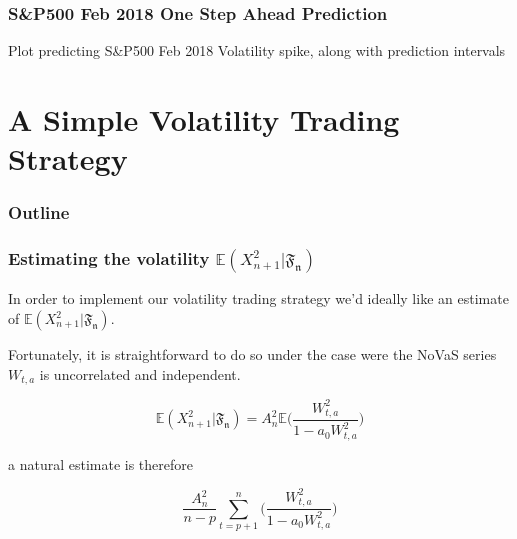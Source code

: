 \documentclass{beamer}
\begin{document}
\begin{frame}
\frametitle{S\&P500 Feb 2018 One Step Ahead Prediction}
Plot predicting S\&P500 Feb 2018 Volatility spike, along with prediction intervals

\end{frame}

\section{A Simple Volatility Trading Strategy}

\begin{frame}
\frametitle{Outline}
\tableofcontents[currentsection]
\end{frame}

\begin{frame}
\frametitle{Estimating the volatility $\mathbb{E}(X_{n+1}^2|\mathfrak{F_n})$
}

In order to implement our volatility trading strategy we'd ideally like an estimate of $\mathbb{E}(X_{n+1}^2|\mathfrak{F_{n}})$. \\

\vspace{5pt}

Fortunately, it is straightforward to do so under the case were the NoVaS series $W_{t,a}$ is uncorrelated and independent.

$$\mathbb{E}(X_{n+1}^2|\mathfrak{F_{n}}) = A_{n}^2 \mathbb{E} \bigg( \frac{W_{t,a}^2}{1-a_0 W_{t,a}^2} \bigg) $$

a natural estimate is therefore

$$ \frac{A_{n}^2}{n-p} \sum_{t=p+1}^{n} \bigg( \frac{W_{t,a}^2}{1-a_0 W_{t,a}^2} \bigg) $$

\end{frame}
\end{document}
